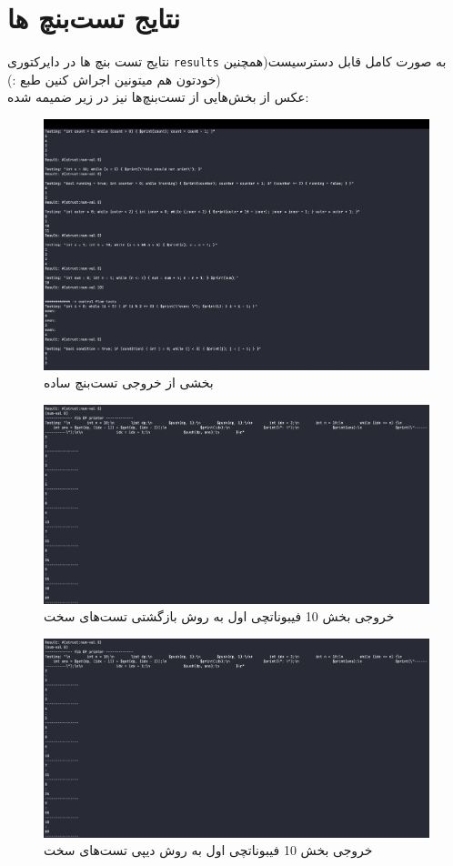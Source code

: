 \documentclass{article}
\begin{document}
\section{نتایج تست‌بنچ ها}
نتایج تست بنچ ها در دایرکتوری 
\texttt{results}
به صورت کامل قابل دسترسیست(همچنین خودتون هم میتونین اجراش کنین طبع :))
\\
عکس از بخش‌هایی از تست‌بنچ‌ها نیز در زیر ضمیمه شده:
\begin{figure}[h]
           \centering
        \includegraphics[width=1\linewidth]{pics/basic.png}
        \caption{بخشی از خروجی تست‌بنچ ساده}
\end{figure}
\begin{figure}[h]
           \centering
        \includegraphics[width=1\linewidth]{pics/fibdp.png}
        \caption{خروجی بخش 10 فیبوناتچی اول به روش بازگشتی تست‌های سخت}
\end{figure}
\begin{figure}[h]
           \centering
        \includegraphics[width=1\linewidth]{pics/fibdp.png}
        \caption{خروجی بخش 10 فیبوناتچی اول به روش دیپی تست‌های سخت}
\end{figure}
\end{document}

